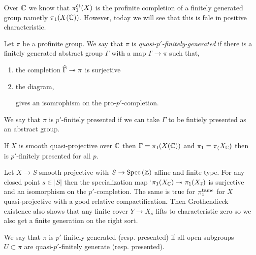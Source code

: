 \documentclass[12pt]{article}
\begin{document}
\begin{prop}
Over $\mathbb{C}$ we know that $\pi_1^{\text{\'{e}t}}(X)$ is the profinite completion of a finitely generated group nametly $\pi_1(X(\mathbb{C}))$. However, today we will see that this is fale in positive characteristic. 
\end{prop}

\begin{defn}
Let $\pi$ be a profinite group. We say that $\pi$ is \textit{quasi-$p'$-finitely-generated} if there is a finitely generated abstract group $\Gamma$ with a map $\Gamma \to \pi$ such that,
\begin{enumerate}
\item the completion $\widehat{\Gamma} \twoheadrightarrow \pi$ is surjective
\item the diagram,
\begin{center}
\end{center}
gives an isomrophism on the pro-$p'$-completion.
\end{enumerate}
We say that $\pi$ is $p'$-finitely presented if we can take $\Gamma$ to be fintiely presented as an abstract group.
\end{defn}

\begin{example}
If $X$ is smooth quasi-projective over $\mathbb{C}$ then $\Gamma = \pi_1(X(\mathbb{C}))$ and $\pi_1 = \pi_(X_{\mathbb{C}})$ then is $p'$-finitely presented for all $p$.
\end{example}

\begin{example}
Let $X \to S$ smooth projective with $S \to \mathrm{Spec}\left( \mathbb{Z} \right)$ affine and finite type. For any closed point $s \in |S|$ then the specialization map $\sp : \pi_1(X_{\mathbb{C}}) \twoheadrightarrow \pi_1(X_{\bar{s}})$ is surjective and an isomorphism on the $p'$-completion. The same is true for $\pi_1^{\mathrm{tame}}$ for $X$ quasi-projective with a good relative compactification. Then Grothendieck existence also shows that any finite \etale cover $Y \to X_{\bar{s}}$ lifts to characteristic zero so we also get a finite generation on the right sort. 
\end{example}

\begin{defn}
We say that $\pi$ is $p'$-finitely generated (resp. presented) if all open subgroups $U \subset \pi$ are quasi-$p'$-finitely generate (resp. presented).
\end{defn}
\end{document}
